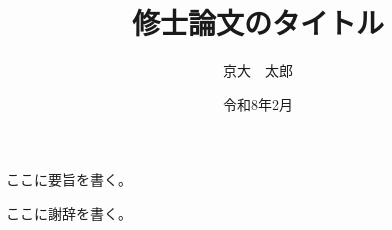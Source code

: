 \documentclass[
  master,
  uplatex,dvipdfmx
]{ku-thesis-ceum}
\begin{document}
\title{修士論文のタイトル}
\author{京大　太郎}

\date{令和8年2月}


\frontmatter

\maketitle

\Yoshi
ここに要旨を書く。

\tableofcontents

\mainmatter



% 
% 

\Shaji
ここに謝辞を書く。

\end{document}
